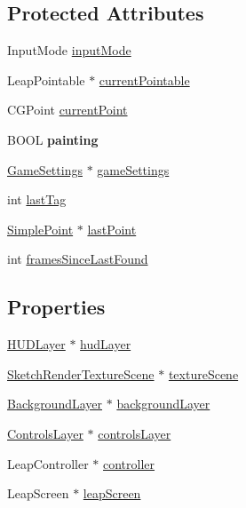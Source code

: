 \subsection*{Protected Attributes}
\begin{DoxyCompactItemize}
\item 
Input\-Mode \hyperlink{interface_game_manager_a43f8cf09eea5b0766c73b0d2b258644c}{input\-Mode}
\item 
Leap\-Pointable $\ast$ \hyperlink{interface_game_manager_a9899e94be0e9364a59e5b76d5025d9f7}{current\-Pointable}
\item 
C\-G\-Point \hyperlink{interface_game_manager_a880d3cc994cc208b57a97fac088c2781}{current\-Point}
\item 
\hypertarget{interface_game_manager_a71f6112c6ebea5c0083db68cdb0e01d8}{B\-O\-O\-L {\bfseries painting}}\label{d4/d94/interface_game_manager_a71f6112c6ebea5c0083db68cdb0e01d8}

\item 
\hyperlink{interface_game_settings}{Game\-Settings} $\ast$ \hyperlink{interface_game_manager_a97ff3b8cd0cbc6baf6f5abe3bb3417ca}{game\-Settings}
\item 
int \hyperlink{interface_game_manager_a0b83b09829718f85c17d64f6ee06d441}{last\-Tag}
\item 
\hyperlink{interface_simple_point}{Simple\-Point} $\ast$ \hyperlink{interface_game_manager_a4f2a6986ffdbc41d661e90deaee4551a}{last\-Point}
\item 
int \hyperlink{interface_game_manager_a546c4660d830a79c27bc2a51da00df12}{frames\-Since\-Last\-Found}
\end{DoxyCompactItemize}
\subsection*{Properties}
\begin{DoxyCompactItemize}
\item 
\hyperlink{interface_h_u_d_layer}{H\-U\-D\-Layer} $\ast$ \hyperlink{interface_game_manager_ae286fb2f9d31810d73c7231a574b56b0}{hud\-Layer}
\item 
\hyperlink{interface_sketch_render_texture_scene}{Sketch\-Render\-Texture\-Scene} $\ast$ \hyperlink{interface_game_manager_a79a86ff991f39b3007d99ca61af21253}{texture\-Scene}
\item 
\hyperlink{interface_background_layer}{Background\-Layer} $\ast$ \hyperlink{interface_game_manager_a2a3a96f1202b13592f244cf1402b4051}{background\-Layer}
\item 
\hyperlink{interface_controls_layer}{Controls\-Layer} $\ast$ \hyperlink{interface_game_manager_a0ee5903be06e4a676ddde4c1f03530a7}{controls\-Layer}
\item 
Leap\-Controller $\ast$ \hyperlink{interface_game_manager_a4b089253ae3569099d28535b128f3436}{controller}
\item 
Leap\-Screen $\ast$ \hyperlink{interface_game_manager_a85cb30e21c987f66855a762c6ba88096}{leap\-Screen}
\end{DoxyCompactItemize}


